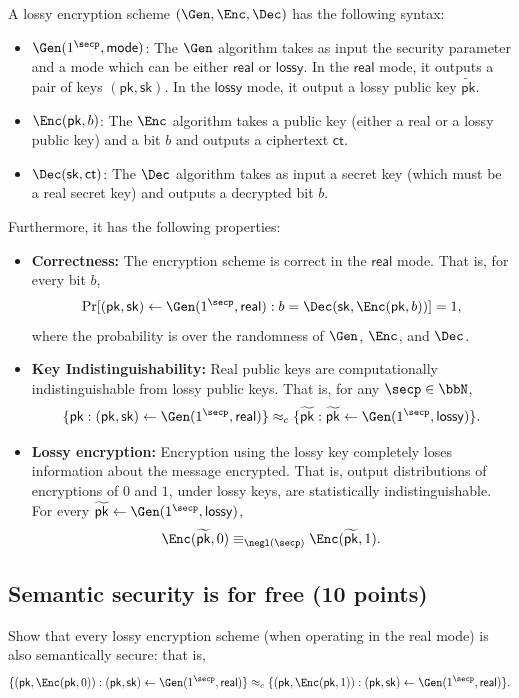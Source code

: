 \documentclass{article}
\newcommand{\pk}{\mathsf{pk}}
\newcommand{\sk}{\mathsf{sk}}
\newcommand{\ct}{\mathsf{ct}}
\newcommand{\real}{\mathsf{real}}
\newcommand{\lossy}{\mathsf{lossy}}
\begin{document}
A lossy encryption scheme $(\Gen, \Enc, \Dec)$ has the following syntax:
\begin{itemize}
    \item $\Gen(1^{\secp}, \mathsf{mode})$: The $\Gen$ algorithm takes as input the security parameter and a mode which can be either $\real$ or $\lossy$. In the $\real$ mode, it outputs a pair of keys $(\pk, \sk)$. In the $\lossy$ mode, it output a lossy public key $\widetilde{\pk}$.
    \item $\Enc(\pk, b)$: The $\Enc$ algorithm takes a public key (either a real or a lossy public key) and a bit $b$ and outputs a ciphertext $\ct$.
    \item $\Dec(\sk, \ct)$: The $\Dec$ algorithm takes as input a secret key (which must be a real secret key) and outputs a decrypted bit $b$.
\end{itemize}

\noindent Furthermore, it has the following properties:
\begin{itemize}
    \item \textbf{Correctness:} The encryption scheme is correct in the $\real$ mode. That is, for every bit $b$,
        \[ \Pr[(\pk, \sk) \gets \Gen(1^{\secp}, \real) : b = \Dec(\sk, \Enc(\pk, b))] = 1, \]
    where the probability is over the randomness of $\Gen$, $\Enc$, and $\Dec$.
    \item \textbf{Key Indistinguishability:} Real public keys are computationally indistinguishable from lossy public keys. That is, for any $\secp \in \bbN$,
    \[ \{ \pk: (\pk, \sk) \gets \Gen(1^{\secp}, \real) \} \approx_c \{ \widetilde{\pk}: \widetilde{\pk} \gets \Gen(1^{\secp}, \lossy)\}. \]
    \item \textbf{Lossy encryption:} Encryption using the lossy key completely loses information about the message encrypted. That is, output distributions of encryptions of $0$ and $1$, under lossy keys, are statistically indistinguishable. For every $\widetilde{\pk} \gets \Gen(1^{\secp}, \lossy)$,
        \[ \Enc(\widetilde{\pk}, 0) \equiv_{\negl(\secp)} \Enc(\widetilde{\pk}, 1). \]
\end{itemize}
\subsection{Semantic security is for free (10 points)}
Show that every lossy encryption scheme (when operating in the real mode) is also semantically secure: that is,
    \[ \{ (\pk, \Enc(\pk, 0)): (\pk, \sk) \gets \Gen(1^{\secp}, \real) \} \approx_c \{ (\pk, \Enc(\pk, 1)): (\pk, \sk) \gets \Gen(1^{\secp}, \real) \}. \]
\end{document}
